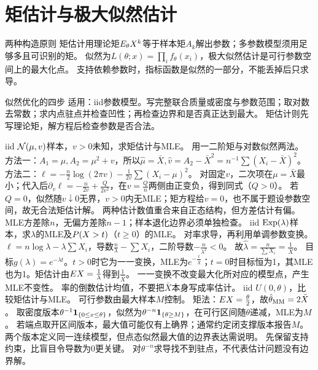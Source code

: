 \section{矩估计与极大似然估计}\label{sec:71}
\begin{definition}{两种构造原则}
矩估计用理论矩$E_\theta X^k$等于样本矩$A_k$解出参数；多参数模型须用足够多且可识别的矩。
似然为$L(\theta;x)=\prod_i f_\theta(x_i)$，极大似然估计是可行参数空间上的最大化点。
支持依赖参数时，指标函数是似然的一部分，不能丢掉后只求导。
\end{definition}
\begin{method}{似然优化的四步}
适用：iid参数模型。写完整联合质量或密度与参数范围；取对数去常数；求内点驻点并检查凹性；再检查边界和是否真正达到最大。
矩估计则先写理论矩，解方程后检查参数是否合法。
\end{method}
{iid $\mathcal N(\mu,v)$样本，$v>0$未知，求矩估计与MLE。}
{用一二阶矩与对数似然两法。}
{方法一：$A_1=\mu,A_2=\mu^2+v$，所以$\hat\mu=\bar X,\hat v=A_2-\bar X^2=n^{-1}\sum(X_i-\bar X)^2$。
方法二：$\ell=-\frac n2\log(2\pi v)-\frac1{2v}\sum(X_i-\mu)^2$。
对固定$v$，二次项在$\mu=\bar X$最小；代入后$\partial_v\ell=-\frac{n}{2v}+\frac{Q}{2v^2}$，在$v=\frac{Q}{n}$两侧由正变负，得到同式（$Q>0$）。
若$Q=0$，似然随$v\downarrow0$无界，$v>0$内无MLE；矩方程给$v=0$，也不属于题设参数空间，故无合法矩估计解。}
{两种估计数值重合来自正态结构，但方差估计有偏。}
{MLE方差除$n$，无偏方差除$n-1$；样本退化边界必须单独检查。}
{iid $\operatorname{Exp}(\lambda)$样本，求$\lambda$的MLE及$P(X>t)$（$t\ge0$）的MLE。}
{对率求导，再利用单调参数变换。}
{$\ell=n\log\lambda-\lambda\sum X_i$，导数$\frac{n}{\lambda}-\sum X_i$，二阶导数$-\frac{n}{\lambda^2}<0$。
故$\hat\lambda=\frac{n}{\sum X_i}=\frac{1}{\bar X}$。
目标$g(\lambda)=e^{-\lambda t}$。$t>0$时它为一一变换，MLE为$e^{-\frac{t}{\bar X}}$；$t=0$时目标恒为1，其MLE也为1。矩估计由$E X=\frac{1}{\lambda}$得到$\frac{1}{\bar X}$。}
{一一变换不改变最大化所对应的模型点，产生MLE不变性。}
{率的倒数估计均值，不要把$\bar X$本身写成率估计。}
{iid $U(0,\theta)$，比较矩估计与MLE。}
{可行参数由最大样本$M$控制。}
{矩法：$E X=\frac{\theta}{2}$，故$\hat\theta_{\rm MM}=2\bar X$。
取密度版本$\theta^{-1}\mathbf1_{\{0\le x\le\theta\}}$，似然为$\theta^{-n}\mathbf1_{\{\theta\ge M\}}$，在可行区间随$\theta$递减，MLE为$M$。
若端点取开区间版本，最大值可能仅有上确界；通常约定闭支撑版本报告$M$。两个版本定义同一连续模型，但点态似然最大值的边界表达需说明。}
{先保留支持约束，比盲目令导数为0更关键。}
{对$\theta^{-n}$求导找不到驻点，不代表估计问题没有边界解。}

